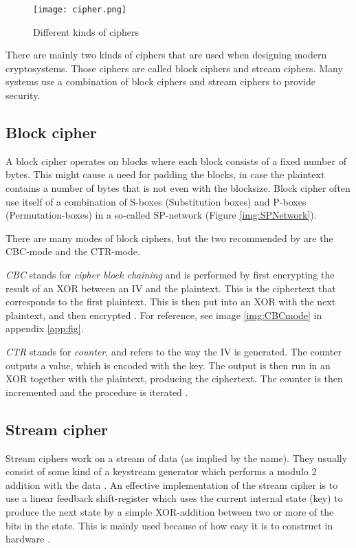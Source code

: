 \begin{figure}
  \texttt{[image: cipher.png]}
  \caption{Different kinds of ciphers \citep{CipherTax:2013}}
  \label{img:ciphers}
\end{figure}

There are mainly two kinds of ciphers that are used when designing 
modern cryptosystems. Those ciphers are called block ciphers and 
stream ciphers. Many systems use a combination of block ciphers and 
stream ciphers to provide security. 


\subsection{Block cipher}\label{sec:BlockCipher}
A block cipher operates on blocks where each block consists of a fixed 
number of bytes. This might cause a need for padding the blocks, in 
case the plaintext contains a number of bytes that is not even with the 
blocksize. Block cipher often use itself of a combination of S-boxes 
(Substitution boxes) and P-boxes (Permutation-boxes) in a so-called 
SP-network (Figure \ref{img:SPNetwork}).

There are many modes of block ciphers, but the two recommended by 
\citet{Schneier:2003} are the CBC-mode and the CTR-mode.

\emph{CBC} stands for \emph{cipher block chaining} and is performed by 
first encrypting the result of an XOR between an IV and the plaintext. 
This is the ciphertext that corresponds to the first plaintext. This is 
then put into an XOR with the next plaintext, and then encrypted 
\citep[pp. 109--111]{Stinson:2006}. For reference, see image 
\ref{img:CBCmode} in appendix \ref{app:fig}.

\emph{CTR} stands for \emph{counter}, and refers to the way the IV is 
generated. The counter outputs a value, which is encoded with the key. 
The output is then run in an XOR together with the plaintext, producing 
the ciphertext. The counter is then incremented and the procedure is 
iterated \citep[p. 111]{Stinson:2006}.

\subsection{Stream cipher} \label{sec:StreamCipher}
Stream ciphers work on a stream of data (as implied by the name). They 
usually consist of some kind of a keystream generator which performs a 
modulo 2 addition with the data \cite[pp. 67]{Simmons:1992}. An 
effective implementation of the stream cipher is to use a linear 
feedback shift-register which uses the current internal state (key) to 
produce the next state by a simple XOR-addition between two or more of 
the bits in the state. This is mainly used because of how easy it is to 
construct in hardware \citep{LFSR:2008}.

